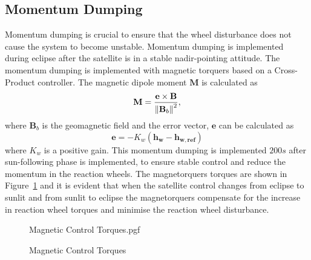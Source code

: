 \subsection{Momentum Dumping}
Momentum dumping is crucial to ensure that the wheel disturbance does not cause the system to become unstable. Momentum dumping is implemented during eclipse after the satellite is in a stable nadir-pointing attitude. The momentum dumping is implemented with magnetic torquers based on a Cross-Product controller. The magnetic dipole moment $\mathbf{M}$ is calculated as 
\begin{equation}
\mathbf{M} = \frac{\mathbf{e} \times \mathbf{B}}{\left\lVert\mathbf{B}_b\right\rVert^2},
\end{equation}
where $\mathbf{B}_b$ is the geomagnetic field and the error vector, $\mathbf{e}$ can be calculated as
\begin{equation}
\mathbf{e} = -K_w(\mathbf{h_w} - \mathbf{h_{w,ref}})
\end{equation}
where $K_w$ is a positive gain. This momentum dumping is implemented $200s$ after sun-following phase is implemented, to ensure stable control and reduce the momentum in the reaction wheels. The magnetorquers torques are shown in Figure~\ref{fig:Magnetic Control Torques} and it is evident that when the satellite control changes from eclipse to sunlit and from sunlit to eclipse the magnetorquers compensate for the increase in reaction wheel torques and minimise the reaction wheel disturbance.

\begin{figure}[!htb]
\centering
\def\pgfwidth{10cm}
{Magnetic Control Torques.pgf}

\caption{Magnetic Control Torques}
\label{fig:Magnetic Control Torques}
\end{figure}